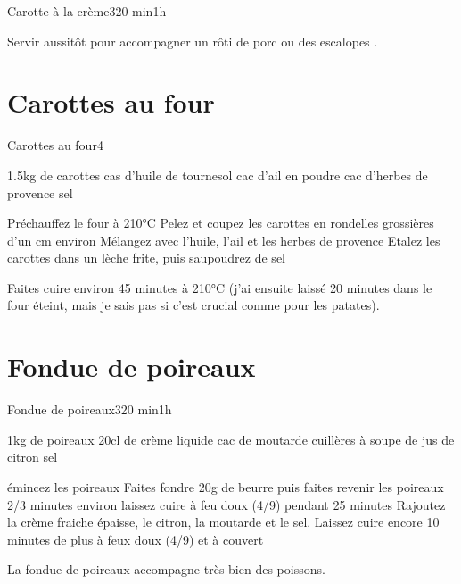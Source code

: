 {\begin{recette}{Carotte à la crème}{3}{20 min}{1h}
\begin{preparation}
\etape Servir aussitôt pour accompagner un rôti de porc ou des escalopes .
\end{preparation}
\end{recette}

\section{Carottes au four}
\begin{recette}{Carottes au four}{4}{}{}
\begin{ingredients}
\ingredient 1.5kg de carottes
 cas d'huile de tournesol
 cac d'ail en poudre
 cac d'herbes de provence
\ingredient sel 
\end{ingredients}

\begin{preparation}
\etape Préchauffez le four à 210°C
\etape Pelez et coupez les carottes en rondelles grossières d'un cm environ
\etape Mélangez avec l'huile, l'ail et les herbes de provence
\etape Etalez les carottes dans un lèche frite, puis saupoudrez de sel
\end{preparation}

\begin{cuisson}
Faites cuire environ 45 minutes à 210°C (j'ai ensuite laissé 20 minutes dans le four éteint, mais je sais pas si c'est crucial comme pour les patates).
\end{cuisson}
\end{recette}

\section{Fondue de poireaux}
\begin{recette}{Fondue de poireaux}{3}{20 min}{1h}
\begin{ingredients}[3 personnes]
\ingredient 1kg de poireaux
\ingredient 20cl de crème liquide
 cac de moutarde
 cuillères à soupe de jus de citron
\ingredient sel
\end{ingredients}

\begin{preparation}
\etape émincez les poireaux
\etape Faites fondre 20g de beurre puis faites revenir les poireaux 2/3 minutes environ
\etape laissez cuire à feu doux (4/9) pendant 25 minutes
\etape Rajoutez la crème fraiche épaisse, le citron, la moutarde et le sel.
\etape Laissez cuire encore 10 minutes de plus à feux doux (4/9) et à couvert
\begin{remarque}
La fondue de poireaux accompagne très bien des poissons.
\end{remarque}
\end{preparation}
\end{recette}

}
